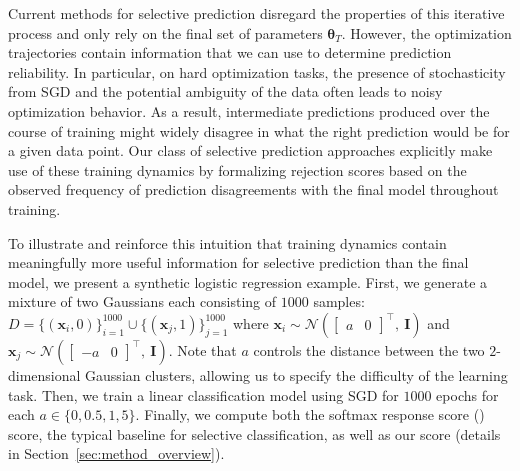 Current methods for selective prediction disregard the properties of this iterative process and only rely on the final set of parameters $\bm{\theta}_{T}$. However, the optimization trajectories contain information that we can use to determine prediction reliability. In particular, on hard optimization tasks, the presence of stochasticity from SGD and the potential ambiguity of the data often leads to noisy optimization behavior. As a result, intermediate predictions produced over the course of training might widely disagree in what the right prediction would be for a given data point. Our class of selective prediction approaches explicitly make use of these training dynamics by formalizing rejection scores based on the observed frequency of prediction disagreements with the final model throughout training.

To illustrate and reinforce this intuition that training dynamics contain meaningfully more useful information for selective prediction than the final model, we present a synthetic logistic regression example. First, we generate a mixture of two Gaussians each consisting of $1000$ samples: $D = \{(\bm{x}_i,0)\}_{i=1}^{1000} \cup \{(\bm{x}_j,1)\}_{j=1}^{1000}$ where $\bm{x}_i \sim \mathcal{N}(\begin{bmatrix}a & 0\end{bmatrix}^\top,\ \bm{I})$ and $\bm{x}_j \sim \mathcal{N}(\begin{bmatrix}-a & 0\end{bmatrix}^\top,\ \bm{I})$. Note that $a$ controls the distance between the two $2$-dimensional Gaussian clusters, allowing us to specify the difficulty of the learning task. Then, we train a linear classification model using SGD for $1000$ epochs for each $a \in \{0,0.5,1,5\}$. Finally, we compute both the softmax response score (\sr) score, the typical baseline for selective classification, as well as our \sptd score (details in Section~\ref{sec:method_overview}).

